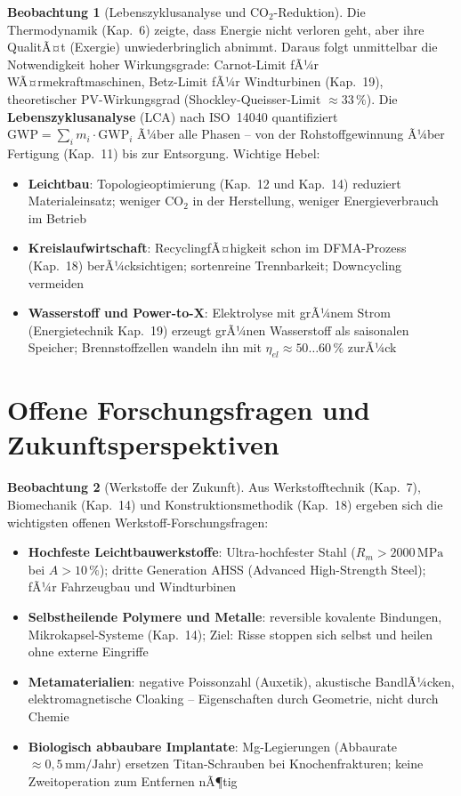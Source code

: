 ﻿\documentclass[a4paper,12pt]{report}
\theoremstyle{definition}
\newtheorem{beobachtung}{Beobachtung}
\begin{document}
\begin{beobachtung}[Lebenszyklusanalyse und CO$_2$-Reduktion]
Die Thermodynamik (Kap.~6) zeigte, dass Energie nicht verloren geht,
aber ihre QualitÃ¤t (Exergie) unwiederbringlich abnimmt.
Daraus folgt unmittelbar die Notwendigkeit hoher Wirkungsgrade:
Carnot-Limit fÃ¼r WÃ¤rmekraftmaschinen, Betz-Limit fÃ¼r Windturbinen (Kap.~19),
theoretischer PV-Wirkungsgrad (Shockley-Queisser-Limit $\approx 33\,\%$).
Die \textbf{Lebenszyklus\-analyse} (LCA) nach ISO~14040 quantifiziert
$\mathrm{GWP} = \sum_i m_i \cdot \mathrm{GWP}_i$ Ã¼ber alle Phasen --
von der Rohstoffgewinnung Ã¼ber Fertigung (Kap.~11) bis zur Entsorgung.
Wichtige Hebel:
\begin{itemize}
    \item[-] \textbf{Leichtbau}: Topologieoptimierung (Kap.~12 und Kap.~14)
          reduziert Materialeinsatz; weniger CO$_2$ in der Herstellung,
          weniger Energieverbrauch im Betrieb
    \item[-] \textbf{Kreislaufwirtschaft}: RecyclingfÃ¤higkeit schon im DFMA-Prozess
          (Kap.~18) berÃ¼cksichtigen; sortenreine Trennbarkeit; Downcycling vermeiden
    \item[-] \textbf{Wasserstoff und Power-to-X}: Elektrolyse mit grÃ¼nem Strom
          (Energietechnik Kap.~19) erzeugt grÃ¼nen Wasserstoff als saisonalen Speicher;
          Brennstoffzellen wandeln ihn mit $\eta_{el} \approx 50\ldots60\,\%$ zurÃ¼ck
\end{itemize}
\end{beobachtung}

\section{Offene Forschungsfragen und Zukunftsperspektiven}

\begin{beobachtung}[Werkstoffe der Zukunft]
Aus Werkstofftechnik (Kap.~7), Biomechanik (Kap.~14) und Konstruktionsmethodik (Kap.~18) ergeben sich die wichtigsten offenen Werkstoff-Forschungsfragen:
\begin{itemize}
    \item[-] \textbf{Hochfeste Leichtbauwerkstoffe}: Ultra-hochfester Stahl
          ($R_m > 2000\,\mathrm{MPa}$ bei $A > 10\,\%$); dritte Generation AHSS
          (Advanced High-Strength Steel); fÃ¼r Fahrzeugbau und Windturbinen
    \item[-] \textbf{Selbstheilende Polymere und Metalle}: reversible kovalente
          Bindungen, Mikrokapsel-Systeme (Kap.~14); Ziel: Risse stoppen
          sich selbst und heilen ohne externe Eingriffe
    \item[-] \textbf{Metamaterialien}: negative Poissonzahl (Auxetik),
          akustische BandlÃ¼cken, elektromagnetische Cloaking --
          Eigenschaften durch Geometrie, nicht durch Chemie
    \item[-] \textbf{Biologisch abbaubare Implantate}: Mg-Legierungen
          (Abbaurate $\approx 0{,}5\,\mathrm{mm/Jahr}$) ersetzen Titan-Schrauben
          bei Knochenfrakturen; keine Zweitoperation zum Entfernen nÃ¶tig
\end{itemize}
\end{beobachtung}
\end{document}
